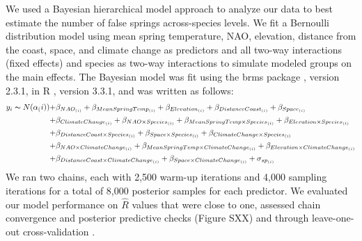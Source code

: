 \documentclass{article}\usepackage[]{graphicx}\usepackage[]{color}
\begin{document}
We used a Bayesian hierarchical model approach to analyze our data to best estimate the number of false springs across-species levels. We fit a Bernoulli distribution model using mean spring temperature, NAO, elevation, distance from the coast, space, and climate change as predictors and all two-way interactions (fixed effects) and species as two-way interactions to simulate modeled groups on the main effects. The Bayesian model was fit using the brms package \citep{brms}, version 2.3.1,  in R \citep{R}, version 3.3.1, and was written as follows: 
\begin{align*} \label{eq:1} 
y_i \thicksim N(\alpha_(i)) +&  \beta_{NAO_{(i)}} + \beta_{MeanSpringTemp_{(i)}} + \beta_{Elevation_{(i)}} + \beta_{DistanceCoast_{(i)}} + \beta_{Space_{(i)}} \\ +& \beta_{ClimateChange_{(i)}}
+ \beta_{NAO \times Species_{(i)}} + \beta_{MeanSpringTemp \times Species_{(i)}} + \beta_{Elevation \times Species_{(i)}} \\ +& \beta_{DistanceCoast \times Species_{(i)}} + \beta_{Space \times Species_{(i)}} + \beta_{ClimateChange \times Species_{(i)}} \\
+& \beta_{NAO \times ClimateChange_{(i)}} + \beta_{MeanSpringTemp \times ClimateChange_{(i)}} 
+ \beta_{Elevation \times ClimateChange_{(i)}} \\ +& \beta_{DistanceCoast \times ClimateChange_{(i)}} + \beta_{Space \times ClimateChange_{(i)}} + \sigma_{sp_{(i)}} 
\end{align*}
We ran two chains, each with 2,500 warm-up iterations and 4,000 sampling iterations for a total of 8,000 posterior samples for each predictor. We evaluated our model performance on $\hat{R}$ values that were close to one, assessed chain convergence and posterior predictive checks (Figure SXX) and through leave-one-out cross-validation \citep{Gelman2006}.
\end{document}
